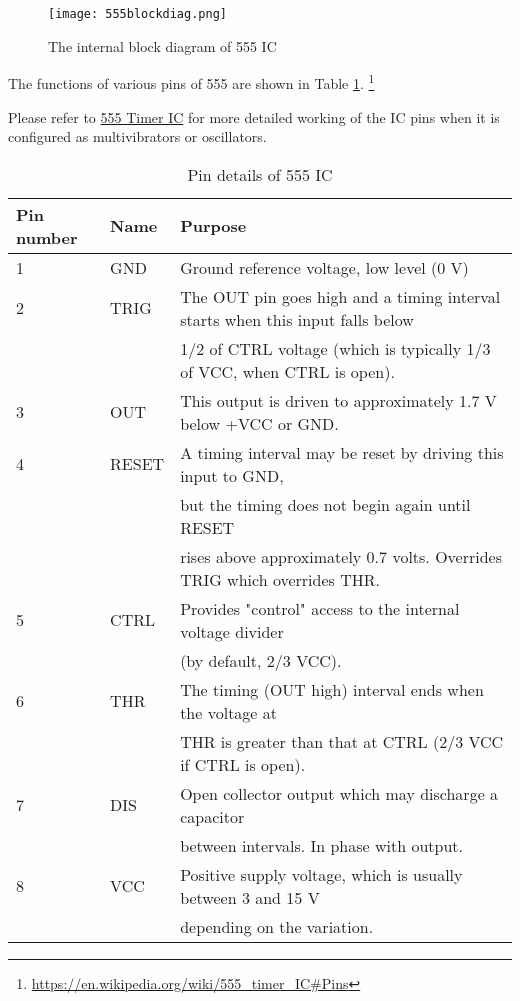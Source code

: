 \begin{figure}[h]


\texttt{[image: 555blockdiag.png]}
\caption{The internal block diagram of 555 IC}

\end{figure}

The functions of various pins of 555 are shown in Table \ref{555pindetails}. \footnote{\url{https://en.wikipedia.org/wiki/555_timer_IC\#Pins}}

Please refer to \href{https://en.wikipedia.org/wiki/555_timer_IC}{555 Timer IC} for more detailed working of the IC pins when it is configured as multivibrators or oscillators.
\begin{table}
\caption{Pin details of 555 IC}

\label{555pindetails}

\begin{tabular}{|l|l|l|}


\hline
Pin number& Name& Purpose \\
\hline
1&	GND	& Ground reference voltage, low level (0 V)\\
\hline
2&	TRIG	& The OUT pin goes high and a timing interval starts when this input falls below\\& &  1/2 of  CTRL voltage (which is typically 1/3 of VCC, when CTRL is open).\\
\hline

3&OUT	&This output is driven to approximately 1.7 V below +VCC or GND.\\
\hline

4	& RESET &	A timing interval may be reset by driving this input to GND,\\& &  but the timing does not begin again until RESET\\& &  rises above approximately 0.7 volts. Overrides TRIG which overrides THR.\\
\hline

5&	CTRL&	Provides "control" access to the internal voltage divider \\& & (by default, 2/3 VCC).\\ \hline
6&	THR& 	The timing (OUT high) interval ends when the voltage at \\& & THR is greater than that at CTRL (2/3 VCC if CTRL is open).\\ \hline

7&	DIS&	Open collector output which may discharge a capacitor \\& & between intervals. In phase with output.\\ \hline
 
8&	VCC	& Positive supply voltage, which is usually between 3 and 15 V \\& &  depending on the variation.\\ \hline

 

\end{tabular}
\end{table}
%
%



